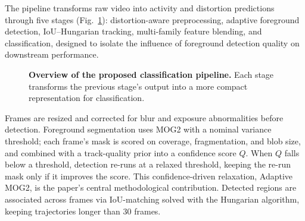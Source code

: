 \documentclass[runningheads]{llncs}
\begin{document}
The pipeline transforms raw video into activity and distortion predictions through five stages (Fig.~\ref{fig:pipeline}): distortion-aware preprocessing, adaptive foreground detection, IoU--Hungarian tracking, multi-family feature blending, and classification, designed to isolate the influence of foreground detection quality on downstream performance.

\begin{figure}[htbp]
\centering
{}
\caption{\textbf{Overview of the proposed classification pipeline.} Each stage transforms the previous stage's output into a more compact representation for classification.}
\label{fig:pipeline}
\end{figure}

Frames are resized and corrected for blur and exposure abnormalities before detection. Foreground segmentation uses MOG2 with a nominal variance threshold; each frame's mask is scored on coverage, fragmentation, and blob size, and combined with a track-quality prior into a confidence score $Q$. When $Q$ falls below a threshold, detection re-runs at a relaxed threshold, keeping the re-run mask only if it improves the score. This confidence-driven relaxation, Adaptive MOG2, is the paper's central methodological contribution. Detected regions are associated across frames via IoU-matching solved with the Hungarian algorithm, keeping trajectories longer than 30 frames.
\end{document}
